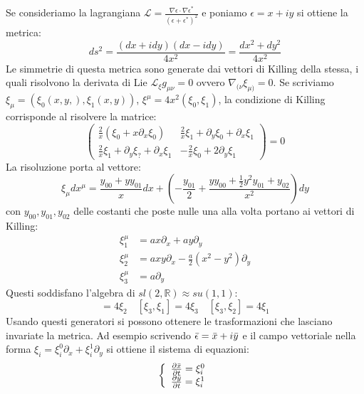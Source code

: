 Se consideriamo la lagrangiana $\mathcal L = \frac{\nabla\epsilon\cdot\nabla\epsilon^*}{(\epsilon + \epsilon^*)^2}$ e poniamo $\epsilon = x + iy$ si ottiene la metrica:
\begin{equation*}
    ds^2 = \frac{(dx + idy)(dx - idy)}{4x^2} = \frac{dx^2 + dy^2}{4x^2}
\end{equation*}
Le simmetrie di questa metrica sono generate dai vettori di Killing della stessa, i quali risolvono la derivata di Lie $\mathcal L_\xi g_{\mu\nu} = 0$ ovvero $\nabla_{(\nu}\xi_{\mu)}=0$. Se scriviamo $\xi_\mu =(\xi_0(x,y,), \xi_1(x,y))$, $\xi^\mu = 4x^2(\xi_0,\xi_1)$, la condizione di Killing corrisponde al risolvere la matrice:
\begin{equation*}
    \begin{pmatrix}
        \frac{2}{x}(\xi_0 + x\partial_x\xi_0) & \frac{2}{x}\xi_1 + \partial_y\xi_0+\partial_x\xi_1 \\
        \frac{2}{x}\xi_1 + \partial_y\xi_? + \partial_x\xi_1 & -\frac{2}{x}\xi_0 + 2\partial_y \xi_1
    \end{pmatrix}
    = 0
\end{equation*}
La risoluzione porta al vettore:
\begin{equation*}
    \xi_\mu dx^\mu = \frac{y_{00} +yy_{01}}{x}dx + \left(-\frac{y_{01}}{2} + \frac{y y_{00} + \frac{1}{2}y^2y_{01} + y_{02}}{x^2}\right)dy
\end{equation*}
con $y_{00}, y_{01}, y_{02}$ delle costanti che poste nulle una alla volta portano ai vettori di Killing:
\begin{align*}
    \xi^\mu_1 &= ax\partial_x + ay\partial_y \\
    \xi^\mu_2 &= axy\partial_x - \frac{a}{2}(x^2-y^2)\partial_y \\
    \xi^\mu_3 &= a\partial_y
\end{align*}
Questi soddisfano l'algebra di $sl(2,\mathbb R) \approx su(1,1)$:
\begin{equation*}
    [\xi_1, \xi_2] = 4\xi_2 \quad [\xi_3 ,\xi_1] = 4\xi_3 \quad [\xi_3, \xi_2] = 4\xi_1
\end{equation*}
Usando questi generatori si possono ottenere le trasformazioni che lasciano invariate la metrica. Ad esempio scrivendo $\Bar{\epsilon} = \Bar{x}+ i \Bar{y}$  e il campo vettoriale nella forma $\xi_i = \xi^0_i\partial_x + \xi^1_i\partial_y$  si ottiene il sistema di equazioni:
\begin{equation*}
    \left\{\begin{array}{cc}
         \frac{\partial \Bar{x}}{\partial t} = \xi^0_i \\
         \frac{\partial\Bar{y}}{\partial t} = \xi^1_i
    \end{array}\right.
\end{equation*}

